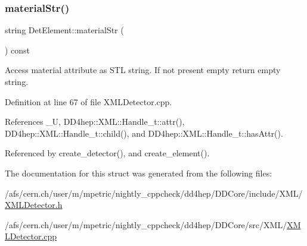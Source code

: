 \subsubsection{\texorpdfstring{material\+Str()}{materialStr()}}
{\footnotesize\ttfamily string Det\+Element\+::material\+Str (\begin{DoxyParamCaption}{ }\end{DoxyParamCaption}) const}



Access material attribute as S\+TL string. If not present empty return empty string. 



Definition at line 67 of file X\+M\+L\+Detector.\+cpp.



References \+\_\+U, D\+D4hep\+::\+X\+M\+L\+::\+Handle\+\_\+t\+::attr(), D\+D4hep\+::\+X\+M\+L\+::\+Handle\+\_\+t\+::child(), and D\+D4hep\+::\+X\+M\+L\+::\+Handle\+\_\+t\+::has\+Attr().



Referenced by create\+\_\+detector(), and create\+\_\+element().



The documentation for this struct was generated from the following files\+:\begin{DoxyCompactItemize}
\item 
/afs/cern.\+ch/user/m/mpetric/nightly\+\_\+cppcheck/dd4hep/\+D\+D\+Core/include/\+X\+M\+L/\hyperlink{_x_m_l_detector_8h}{X\+M\+L\+Detector.\+h}\item 
/afs/cern.\+ch/user/m/mpetric/nightly\+\_\+cppcheck/dd4hep/\+D\+D\+Core/src/\+X\+M\+L/\hyperlink{_x_m_l_detector_8cpp}{X\+M\+L\+Detector.\+cpp}\end{DoxyCompactItemize}
